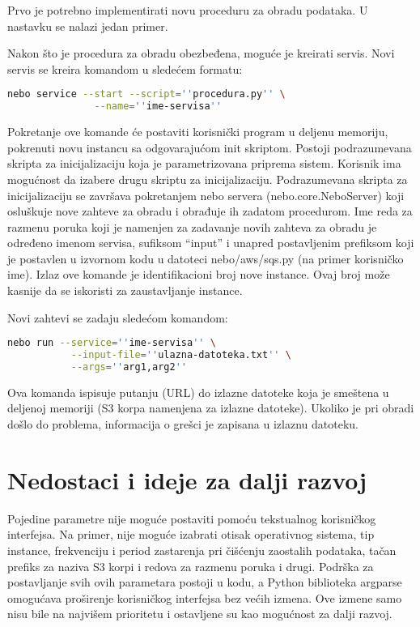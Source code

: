 \documentclass[a4paper]{article}
\begin{document}
Prvo je potrebno implementirati novu proceduru za obradu podataka. U nastavku se
nalazi jedan primer.



Nakon što je procedura za obradu obezbeđena, moguće je kreirati servis. Novi
servis se kreira komandom u sledećem formatu:

\begin{lstlisting}[language=bash,breaklines=true,numbers=none]
  nebo service --start --script=''procedura.py'' \
               --name=''ime-servisa''
\end{lstlisting}

Pokretanje ove komande će postaviti korisnički program u deljenu memoriju,
pokrenuti novu instancu sa odgovarajućom init skriptom. Postoji podrazumevana
skripta za inicijalizaciju koja je parametrizovana priprema sistem. Korisnik ima
mogućnost da izabere drugu skriptu za inicijalizaciju. Podrazumevana skripta za
inicijalizaciju se završava pokretanjem nebo servera (nebo.core.NeboServer) koji
osluškuje nove zahteve za obradu i obrađuje ih zadatom procedurom. Ime reda za
razmenu poruka koji je namenjen za zadavanje novih zahteva za obradu je određeno
imenom servisa, sufiksom ``input'' i unapred postavljenim prefiksom koji je
postavlen u izvornom kodu u datoteci nebo/aws/sqs.py (na primer korisničko ime).
Izlaz ove komande je identifikacioni broj nove instance. Ovaj broj može kasnije
da se iskoristi za zaustavljanje instance.

Novi zahtevi se zadaju sledećom komandom:

\begin{lstlisting}[language=bash,breaklines=true,numbers=none]
  nebo run --service=''ime-servisa'' \
           --input-file=''ulazna-datoteka.txt'' \
           --args=''arg1,arg2''
\end{lstlisting}

Ova komanda ispisuje putanju (URL) do izlazne datoteke koja je smeštena u
deljenoj memoriji (S3 korpa namenjena za izlazne datoteke). Ukoliko je pri
obradi došlo do problema, informacija o grešci je zapisana u izlaznu datoteku.


\section{Nedostaci i ideje za dalji razvoj}

Pojedine parametre nije moguće postaviti pomoću tekstualnog korisničkog
interfejsa. Na primer, nije moguće izabrati otisak operativnog sistema, tip
instance, frekvenciju i period zastarenja pri čišćenju zaostalih podataka, tačan
prefiks za naziva S3 korpi i redova za razmenu poruka i drugi. Podrška za
postavljanje svih ovih parametara postoji u kodu, a Python biblioteka argparse
omogućava proširenje korisničkog interfejsa bez većih izmena. Ove izmene samo
nisu bile na najvišem prioritetu i ostavljene su kao mogućnost za dalji razvoj.
\end{document}

